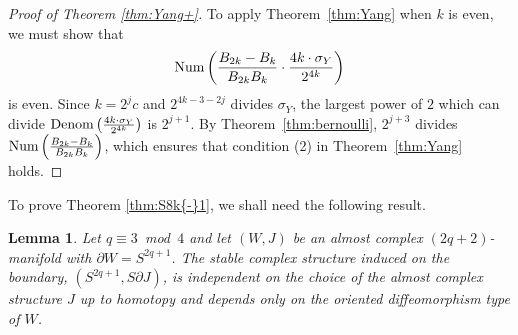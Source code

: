 \documentclass[12pt]{amsart}
\newcommand\acxs{J}						%
\newcommand\Num{\textup{Num}}
\newcommand\Denom{\textup{Denom}}
\newcommand\del{\partial}
\newtheorem{Lemma}[Theorem]{Lemma}
\newtheorem{Corollary}[Theorem]{Corollary}
\theoremstyle{remark}
\begin{document}
\begin{proof}[Proof of Theorem \ref{thm:Yang+}]
To apply Theorem~\ref{thm:Yang} when 
$k$ is even, we must show that
%
\[ \Num \left( \frac{B_{2k}-B_{k}}{B_{2k}B_{k}} 
\cdot \frac{4k \cdot \sigma_Y}{2^{4k}}\right) \]
%
is even. Since $k =
2^j c$ and $2^{4k-3-2j}$ divides $\sigma_Y$, the largest power of $2$
which can divide $\Denom \left( \frac{4k \cdot \sigma_Y}{2^{4k}}
\right)$ is $2^{j+1}$.  By Theorem~\ref{thm:bernoulli},
$2^{j+3}$ divides $\Num \left( \frac{B_{2k}-B_k}{B_{2k}B_k} \right)$,
which ensures that condition (2) in Theorem~\ref{thm:Yang} holds.
\end{proof}

To prove Theorem \ref{thm:S8k{-}1}, we shall need the following result.
\begin{Lemma} \label{lem:delJ_is_topological}
Let $q \equiv 3$~mod~$4$ and let $(W, J)$ be an almost complex $(2q{+}2)$-manifold with $\del W = S^{2q{+}1}$.  
The stable complex structure induced on the boundary, $(S^{2q{+}1}, S\del \acxs)$, is independent
on the choice of the almost complex structure $\acxs$ up to homotopy and depends only on the 
oriented diffeomorphism
type of $W$.
\end{Lemma}
\end{document}

